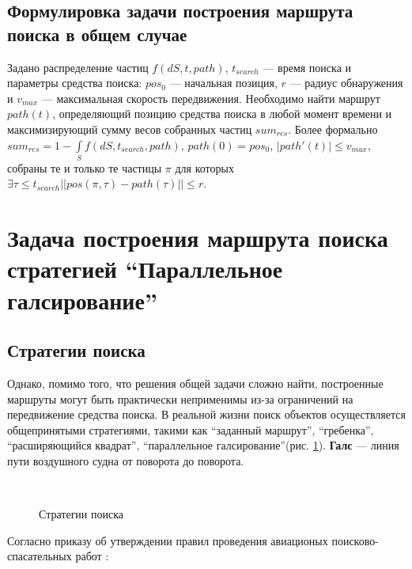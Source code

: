 \FloatBarrier
\subsection{Формулировка задачи построения маршрута поиска 
в общем случае}
Задано распределение частиц $f(dS, t, path)$, $t_{search}$ --- время поиска
и параметры средства поиска: $pos_0$ --- начальная позиция, $r$ --- радиус обнаружения и 
$v_{max}$ --- максимальная скорость передвижения.
 Необходимо найти маршрут $path(t)$, определяющий
позицию средства поиска в любой момент времени и максимизирующий сумму весов собранных
частиц $sum_{res}$.
Более формально $sum_{res}=1-\int\limits_Sf(dS, t_{search}, path)$, $path(0)=pos_0$,
 $|path'(t)|\le v_{max}$, собраны те и только те частицы
 $\pi$ для которых $\exists \tau\le t_{search} ||pos(\pi, \tau)-path(\tau)|| \le r$. 
\FloatBarrier
\section{Задача построения маршрута поиска
 стратегией ``Параллельное галсирование''}

\subsection{Стратегии поиска}
Однако, помимо того, что решения общей задачи сложно найти, построенные маршруты могут быть
практически неприменимы из-за ограничений на передвижение средства поиска. В реальной жизни
поиск объектов осуществляется общепринятыми стратегиями, такими как ``заданный маршрут'',
``гребенка'', ``расширяющийся квадрат'',
``параллельное галсирование''(рис. \ref{strat:subfigures}).
\textbf{Галс} --- линия пути воздушного судна от поворота до поворота.
\begin{figure}[ht]
  \begin{center}
    \\
  \end{center}
 \caption{Стратегии поиска}
 \label{strat:subfigures}
\end{figure}

Согласно приказу об утверждении правил проведения авиационых поисково-спасательных работ
\cite{napss90}:

